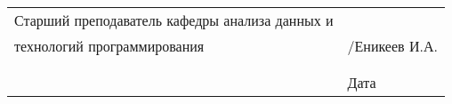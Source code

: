 \documentclass[a4paper,article]{article}
\begin{document}
\begin{sloppypar}
    \begin{xltabular}{\textwidth} {
            >{\hsize} X
            >{\hsize} X }
        Старший преподаватель кафедры анализа данных и & \\
        технологий программирования & \underline{\hspace{3cm}}/Еникеев И.А. \\
        & \\
        & \\
        & \hfil Дата \underline{\hspace{3cm}} \\
    \end{xltabular}
\end{sloppypar}
\end{document}

